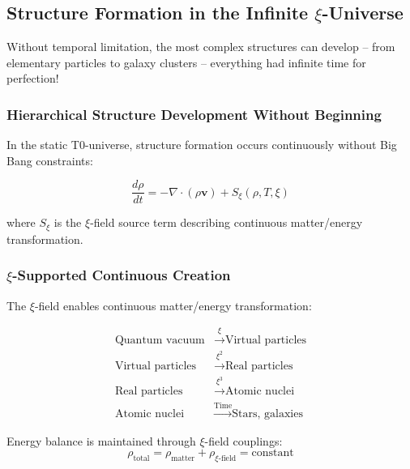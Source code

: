\documentclass[12pt,a4paper]{article}
\theoremstyle{definition}
\begin{document}
	\subsection{Structure Formation in the Infinite $\xi$-Universe}
	
	\begin{revolutionary}
		Without temporal limitation, the most complex structures can develop -- from elementary particles to galaxy clusters -- everything had infinite time for perfection!
	\end{revolutionary}
	
	\subsubsection{Hierarchical Structure Development Without Beginning}
	
	In the static T0-universe, structure formation occurs continuously without Big Bang constraints:
	
	\begin{equation}
		\frac{d\rho}{dt} = -\nabla \cdot (\rho \mathbf{v}) + S_{\xi}(\rho, T, \xi)
	\end{equation}
	
	where $S_{\xi}$ is the $\xi$-field source term describing continuous matter/energy transformation.
	
	\subsubsection{$\xi$-Supported Continuous Creation}
	
	The $\xi$-field enables continuous matter/energy transformation:
	
	\begin{align}
		\text{Quantum vacuum} &\xrightarrow{\xi} \text{Virtual particles} \nonumber \\
		\text{Virtual particles} &\xrightarrow{\xi^2} \text{Real particles} \nonumber \\
		\text{Real particles} &\xrightarrow{\xi^3} \text{Atomic nuclei} \nonumber \\
		\text{Atomic nuclei} &\xrightarrow{\text{Time}} \text{Stars, galaxies} \nonumber
	\end{align}
	
	Energy balance is maintained through $\xi$-field couplings:
	\begin{equation}
		\rho_{\text{total}} = \rho_{\text{matter}} + \rho_{\xi\text{-field}} = \text{constant}
	\end{equation}
	
\end{document}

